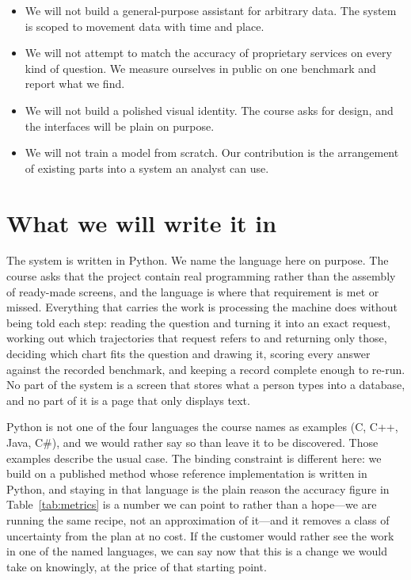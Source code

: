 \documentclass[12pt,a4paper]{report}
\begin{document}
\begin{itemize}
  \item We will not build a general-purpose assistant for arbitrary data. The
    system is scoped to movement data with time and place.
  \item We will not attempt to match the accuracy of proprietary services on
    every kind of question. We measure ourselves in public on one benchmark and
    report what we find.
  \item We will not build a polished visual identity. The course asks for
    design, and the interfaces will be plain on purpose.
  \item We will not train a model from scratch. Our contribution is the
    arrangement of existing parts into a system an analyst can use.
\end{itemize}

\section{What we will write it in}

The system is written in Python. We name the language here on purpose. The
course asks that the project contain real programming rather than the assembly
of ready-made screens, and the language is where that requirement is met or
missed. Everything that carries the work is processing the machine does without
being told each step: reading the question and turning it into an exact request,
working out which trajectories that request refers to and returning only those,
deciding which chart fits the question and drawing it, scoring every answer
against the recorded benchmark, and keeping a record complete enough to re-run.
No part of the system is a screen that stores what a person types into a
database, and no part of it is a page that only displays text.

Python is not one of the four languages the course names as examples (C, C++,
Java, C\#), and we would rather say so than leave it to be discovered. Those
examples describe the usual case. The binding constraint is different here: we
build on a published method whose reference implementation is written in Python,
and staying in that language is the plain reason the accuracy figure in
Table~\ref{tab:metrics} is a number we can point to rather than a hope---we are
running the same recipe, not an approximation of it---and it removes a class of
uncertainty from the plan at no cost. If the customer would rather see the work
in one of the named languages, we can say now that this is a change we would
take on knowingly, at the price of that starting point.
\end{document}
